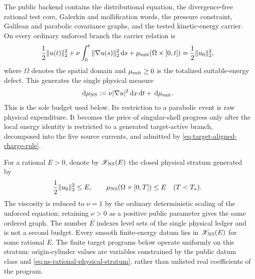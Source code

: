 \documentclass[11pt]{article}
\numberwithin{section}{part}
\theoremstyle{plain}
\theoremstyle{definition}
\theoremstyle{remark}
\newcommand{\dd}{\,\mathrm d}
\begin{document}
The public backend contains the distributional equation, the divergence-free
rational test core, Galerkin and mollification words, the pressure constraint,
Galilean and parabolic covariance graphs, and the tested kinetic-energy
carrier.  On every ordinary unforced branch the carrier relation is
\begin{equation}
 \label{eq:ns-single-physical-budget}
 \frac12\|u(t)\|_2^2+
 \nu\int_0^t\|\nabla u(s)\|_2^2\dd s
 +\mu_{\rm suit}(\Omega\times[0,t])
 =\frac12\|u_0\|_2^2,
\end{equation}
where \(\Omega\) denotes the spatial domain and
\(\mu_{\rm suit}\ge0\) is the totalized suitable-energy defect.  This
generates the single physical measure
\[
 \dd\mu_{\rm NS}
 :=\nu|\nabla u|^2\dd x\dd t+\dd\mu_{\rm suit}.
\]
This is the sole budget used below.
Its restriction to a parabolic event is raw physical expenditure.  It becomes
the price of singular-shell progress only after the local energy identity is
restricted to a generated target-active branch, decomposed into the five
source currents, and admitted by \eqref{eq:target-aligned-charge-rule}.

For a rational \(E>0\), denote by \(\mathscr X_{\rm NS}(E)\) the closed
physical stratum generated by
\begin{equation}
 \label{eq:ns-rational-physical-stratum}
 \frac12\|u_0\|_2^2\le E,
 \qquad
 \mu_{\rm NS}(\Omega\times[0,T])\le E
 \quad(T<T_*).
\end{equation}
The viscosity is reduced to \(\nu=1\) by the ordinary deterministic scaling
of the unforced equation; retaining \(\nu>0\) as a positive public parameter
gives the same ordered graph.  The number \(E\) indexes level sets of the
single physical ledger and is not a second budget.  Every smooth finite-energy
datum lies in \(\mathscr X_{\rm NS}(E)\) for some rational \(E\).  The finite
target programs below operate uniformly on this stratum: origin-cylinder
values are variables constrained by the public datum class and
\eqref{eq:ns-rational-physical-stratum}, rather than unlisted real
coefficients of the program.
\end{document}
